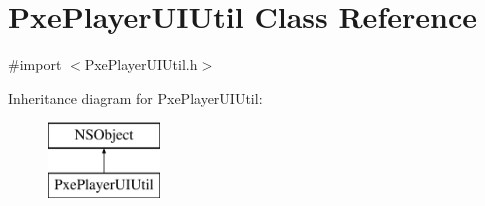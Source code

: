 \hypertarget{interface_pxe_player_u_i_util}{\section{Pxe\-Player\-U\-I\-Util Class Reference}
\label{interface_pxe_player_u_i_util}
}


{\ttfamily \#import $<$Pxe\-Player\-U\-I\-Util.\-h$>$}

Inheritance diagram for Pxe\-Player\-U\-I\-Util\-:\begin{figure}[H]
\begin{center}
\leavevmode
\includegraphics[height=2.000000cm]{interface_pxe_player_u_i_util}
\end{center}
\end{figure}
